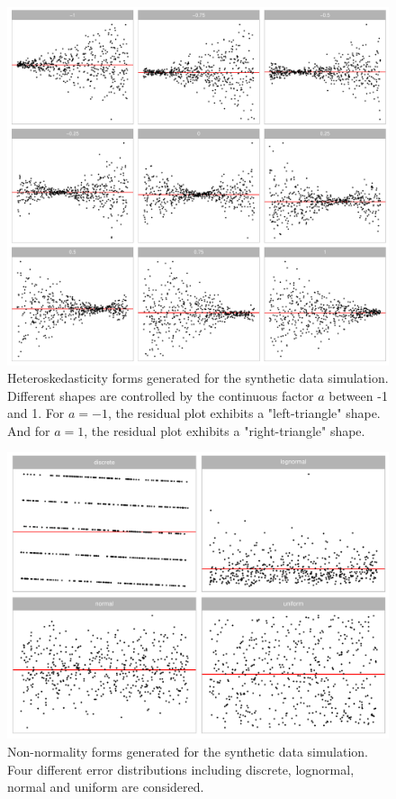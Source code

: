 \documentclass[]{interact}
\theoremstyle{plain}%
\theoremstyle{definition}
\theoremstyle{remark}
\begin{document}
\begin{figure}[!h]

{\centering \includegraphics[width=1\linewidth]{appendix_files/figure-latex/different-a-1} 

}

\caption{Heteroskedasticity forms generated for the synthetic data simulation. Different shapes are controlled by the continuous factor $a$ between -1 and 1. For $a = -1$, the residual plot exhibits a "left-triangle" shape. And for $a = 1$, the residual plot exhibits a "right-triangle" shape. }\label{fig:different-a}
\end{figure}

\begin{figure}[!h]

{\centering \includegraphics[width=1\linewidth]{appendix_files/figure-latex/different-e-1} 

}

\caption{Non-normality forms generated for the synthetic data simulation. Four different error distributions including discrete, lognormal, normal and uniform are considered.}\label{fig:different-e}
\end{figure}
\end{document}
